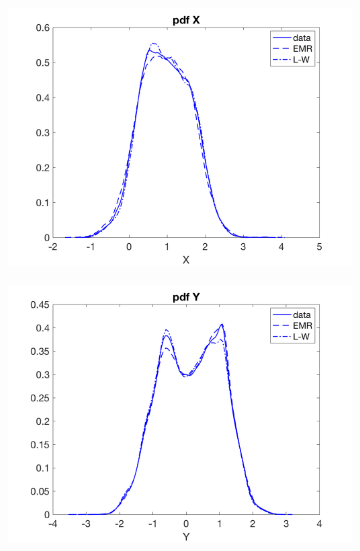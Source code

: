 \documentclass[12pt]{article}
\begin{document}
\begin{figure}[H]
	\centering
	\begin{subfigure}[b]{0.3\textwidth}
		\centering
		\includegraphics[width=\textwidth]{plots/l84l63/pdfxl84025.png}
	\end{subfigure}
	\hfill
	\begin{subfigure}[b]{0.3\textwidth}
		\centering
		\includegraphics[width=\textwidth]{plots/l84l63/pdfyl84025.png}
	\end{subfigure}
	\begin{subfigure}[b]{0.3\textwidth}
		\centering

\end{subfigure}
\end{figure}
\end{document}
